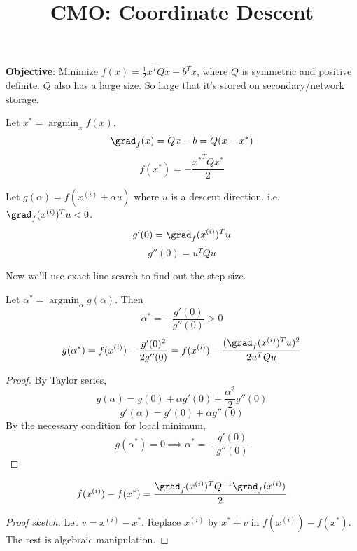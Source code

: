 


\title{CMO: Coordinate Descent}



\maketitle
\initMinimal{}

\textbf{Objective}: Minimize $f(x) = \frac{1}{2}x^TQx - b^Tx$,
where $Q$ is symmetric and positive definite.
$Q$ also has a large size. So large that it's stored on secondary/network storage.

Let $x^* = \operatorname{argmin}_x f(x)$.
\[ \grad_f(x) = Qx - b = Q(x - x^*) \]
\[ f(x^*) = -\frac{{x^*}^TQx^*}{2} \]

Let $g(\alpha) = f(x^{(i)} + \alpha u)$ where $u$ is a descent direction.
i.e. $\grad_f(x^{(i)})^Tu < 0$.
\[ g'(0) = \grad_f(x^{(i)})^Tu \]
\[ g''(0) = u^TQu \]

Now we'll use exact line search to find out the step size.
\begin{theorem}
Let $\alpha^* = \operatorname{argmin}_{\alpha} g(\alpha)$. Then
\[ \alpha^* = - \frac{g'(0)}{g''(0)} > 0 \]
\[ g(\alpha^*) = f(x^{(i)}) - \frac{g'(0)^2}{2g''(0)} = f(x^{(i)}) - \frac{(\grad_f(x^{(i)})^Tu)^2}{2u^TQu} \]
\end{theorem}
\begin{proof}
By Taylor series,
\[ g(\alpha) = g(0) + \alpha g'(0) + \frac{\alpha^2}{2} g''(0) \]
\[ g'(\alpha) = g'(0) + \alpha g''(0) \]
By the necessary condition for local minimum,
\[ g(\alpha^*) = 0 \implies \alpha^* = - \frac{g'(0)}{g''(0)} \]
\end{proof}

\begin{theorem}
\[ f(x^{(i)}) - f(x^*) = \frac{\grad_f(x^{(i)})^T Q^{-1} \grad_f(x^{(i)})}{2} \]
\end{theorem}
\begin{proof}[Proof sketch] Let $v = x^{(i)} - x^*$.
Replace $x^{(i)}$ by $x^* + v$ in $f(x^{(i)}) - f(x^*)$.
The rest is algebraic manipulation.
\end{proof}

